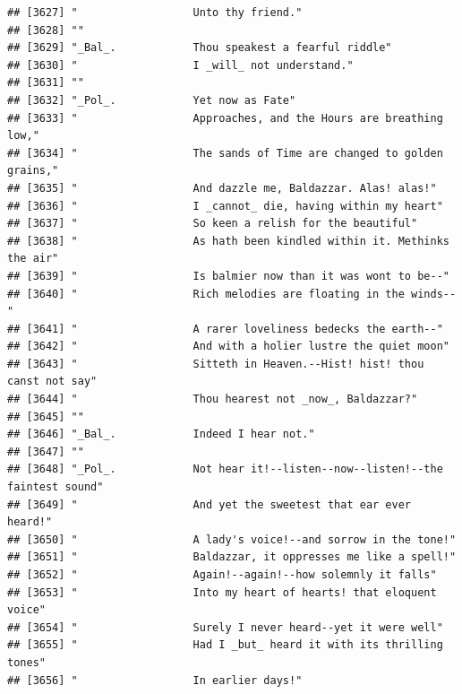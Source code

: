 \documentclass{article}\usepackage[]{graphicx}\usepackage[]{color}
\makeatletter
\newenvironment{kframe}{%
 \def\at@end@of@kframe{}%
 \ifinner\ifhmode%
  \def\at@end@of@kframe{\end{minipage}}%
  \begin{minipage}{\columnwidth}%
 \fi\fi%
 \def\FrameCommand##1{\hskip\@totalleftmargin \hskip-\fboxsep
 \colorbox{shadecolor}{##1}\hskip-\fboxsep
     \hskip-\linewidth \hskip-\@totalleftmargin \hskip\columnwidth}%
 \MakeFramed {\advance\hsize-\width
   \@totalleftmargin\z@ \linewidth\hsize
   \@setminipage}}%
 {\par\unskip\endMakeFramed%
 \at@end@of@kframe}
\newenvironment{knitrout}{}{} %
\makeatother
\begin{document}
\begin{knitrout}
\begin{kframe}
\begin{verbatim}
## [3627] "                  Unto thy friend."                                          
## [3628] ""                                                                            
## [3629] "_Bal_.            Thou speakest a fearful riddle"                            
## [3630] "                  I _will_ not understand."                                  
## [3631] ""                                                                            
## [3632] "_Pol_.            Yet now as Fate"                                           
## [3633] "                  Approaches, and the Hours are breathing low,"              
## [3634] "                  The sands of Time are changed to golden grains,"           
## [3635] "                  And dazzle me, Baldazzar. Alas! alas!"                     
## [3636] "                  I _cannot_ die, having within my heart"                    
## [3637] "                  So keen a relish for the beautiful"                        
## [3638] "                  As hath been kindled within it. Methinks the air"          
## [3639] "                  Is balmier now than it was wont to be--"                   
## [3640] "                  Rich melodies are floating in the winds--"                 
## [3641] "                  A rarer loveliness bedecks the earth--"                    
## [3642] "                  And with a holier lustre the quiet moon"                   
## [3643] "                  Sitteth in Heaven.--Hist! hist! thou canst not say"        
## [3644] "                  Thou hearest not _now_, Baldazzar?"                        
## [3645] ""                                                                            
## [3646] "_Bal_.            Indeed I hear not."                                        
## [3647] ""                                                                            
## [3648] "_Pol_.            Not hear it!--listen--now--listen!--the faintest sound"    
## [3649] "                  And yet the sweetest that ear ever heard!"                 
## [3650] "                  A lady's voice!--and sorrow in the tone!"                  
## [3651] "                  Baldazzar, it oppresses me like a spell!"                  
## [3652] "                  Again!--again!--how solemnly it falls"                     
## [3653] "                  Into my heart of hearts! that eloquent voice"              
## [3654] "                  Surely I never heard--yet it were well"                    
## [3655] "                  Had I _but_ heard it with its thrilling tones"             
## [3656] "                  In earlier days!"                                          

\end{verbatim}
\end{kframe}
\end{knitrout}
\end{document}
